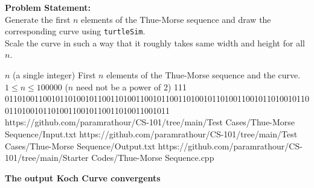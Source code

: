 \textbf{Problem Statement:}\\
Generate the first $n$ elements of the Thue-Morse sequence and draw the corresponding curve using \verb!turtleSim!.\\
Scale the curve in such a way that it roughly takes same width and height for all $n$.
\begin{testcasesMore}
	{$n$ \hfill(a single integer)}
	{First $n$ elements of the Thue-Morse sequence and the curve.}
	{$1 \leq n \leq 100000$ ($n$ need not be a power of 2)}
	{111}
	{011010011001011010010110011010011001011001101001011010011001011010010110011010010110100110010110011010011001011}
	{https://github.com/paramrathour/CS-101/tree/main/Test Cases/Thue-Morse Sequence/Input.txt}
	{https://github.com/paramrathour/CS-101/tree/main/Test Cases/Thue-Morse Sequence/Output.txt}
	{https://github.com/paramrathour/CS-101/tree/main/Starter Codes/Thue-Morse Sequence.cpp}
\end{testcasesMore}
\textbf{The output Koch Curve convergents}

